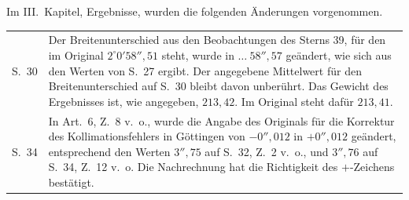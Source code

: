{Im III.\ Kapitel, Ergebnisse, wurden die folgenden Änderungen vorgenommen.
\par\noindent\begin{tabular}{@{}p{.065\linewidth}p{.91\linewidth}@{}}
S.\ 30&Der Breitenunterschied aus den Beobachtungen des Sterns 39, für den im Original
$2^\circ0'58''{,}51$ steht, wurde in $\ldots\ 58''{,}57$ geändert, wie sich aus den Werten von
S.\ 27 ergibt. Der angegebene Mittelwert für den Breitenunterschied auf S.\ 30 bleibt davon
unberührt. Das Gewicht des Ergebnisses ist, wie angegeben, $213{,}42$. Im Original steht
dafür $213{,}41$.\\
S.\ 34&In Art.\ 6, Z.\ 8 v.\ o., wurde die Angabe des Originals für die Korrektur des
Kollimationsfehlers in Göttingen von $-0''{,}012$ in $+0''{,}012$ geändert, entsprechend den
Werten $3''{,}75$ auf S.\ 32, Z.\ 2 v.\ o., und $3''{,}76$ auf S.\ 34, Z.\ 12 v.\ o.
Die Nachrechnung hat die Richtigkeit des $+$-Zeichens bestätigt.
\end{tabular}\par
}

